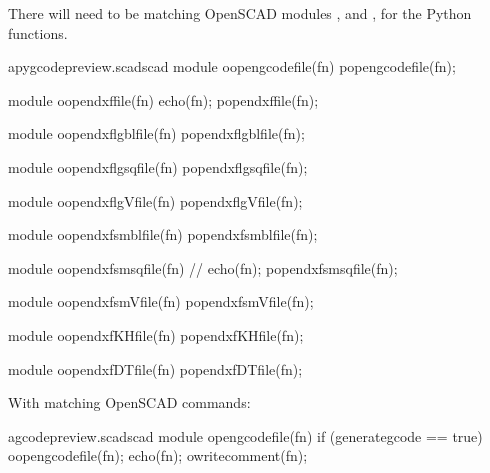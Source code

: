 \documentclass{ltxdoc}
\begin{document}
There will need to be matching OpenSCAD modules 
, and
, 
for the Python functions.

\lstset{firstnumber=\thepyscad}
\begin{writecode}{a}{pygcodepreview.scad}{scad}
module oopengcodefile(fn) {
    popengcodefile(fn);
}

module oopendxffile(fn) {
    echo(fn);
    popendxffile(fn);
}

module oopendxflgblfile(fn) {
    popendxflgblfile(fn);
}

module oopendxflgsqfile(fn) {
    popendxflgsqfile(fn);
}

module oopendxflgVfile(fn) {
    popendxflgVfile(fn);
}

module oopendxfsmblfile(fn) {
    popendxfsmblfile(fn);
}

module oopendxfsmsqfile(fn) {
//    echo(fn);
    popendxfsmsqfile(fn);
}

module oopendxfsmVfile(fn) {
    popendxfsmVfile(fn);
}

module oopendxfKHfile(fn) {
    popendxfKHfile(fn);
}

module oopendxfDTfile(fn) {
    popendxfDTfile(fn);
}

\end{writecode}
\addtocounter{pyscad}{42}

With matching OpenSCAD commands: %
 
\lstset{firstnumber=\thegcpscad}
\begin{writecode}{a}{gcodepreview.scad}{scad}
module opengcodefile(fn) {
if (generategcode == true) {
    oopengcodefile(fn);
    echo(fn);
    owritecomment(fn);
    }
}

\end{writecode}
\addtocounter{gcpscad}{8}
\end{document}
